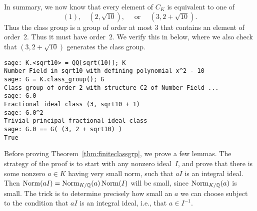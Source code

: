 \begin{example}
In summary, we now know that every element of $C_K$ is equivalent to one of
$$
    (1),\quad (2,\sqrt{10}), \quad \text{ or } \quad (3,2+\sqrt{10}).
$$
Thus the class group is a group of order at most $3$ that contains an
element of order~$2$.  Thus it must have order~$2$.  We verify this in
\sage below, where we also check that $(3, 2+\sqrt{10})$ generates the
class group.
\begin{verbatim}
sage: K.<sqrt10> = QQ[sqrt(10)]; K
Number Field in sqrt10 with defining polynomial x^2 - 10
sage: G = K.class_group(); G
Class group of order 2 with structure C2 of Number Field ...
sage: G.0
Fractional ideal class (3, sqrt10 + 1)
sage: G.0^2
Trivial principal fractional ideal class
sage: G.0 == G( (3, 2 + sqrt10) )
True
\end{verbatim}
\end{example}

Before proving Theorem~\ref{thm:finiteclassgrp}, we prove a few
lemmas.  The strategy of the proof is to start with any nonzero
ideal~$I$, and prove that there is some nonzero $a\in K$ having very
small norm, such that $aI$ is an integral ideal. Then
$\operatorname{Norm}(aI)=\operatorname{Norm}_{K/\mathbb{Q}}(a)\operatorname{Norm}(I)$ will be small, since
$\operatorname{Norm}_{K/\mathbb{Q}}(a)$ is small.  The trick is to determine precisely
how small an $a$ we can choose subject to the condition that
$aI$ is an integral ideal, i.e., that $a\in I^{-1}$.

